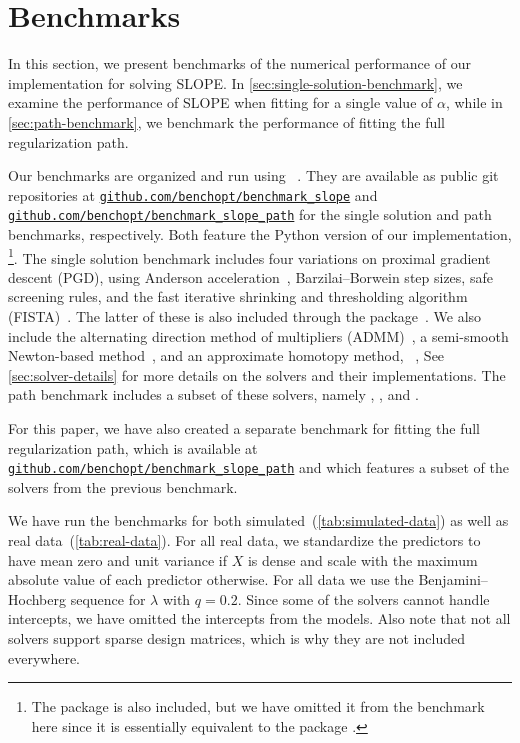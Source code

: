 \documentclass[article]{jss}
\newcommand{\myurl}[1]{\href{https://#1}{\nolinkurl{#1}}}
\begin{document}
\section{Benchmarks}

In this section, we present benchmarks of the numerical performance of our
implementation for solving SLOPE. In \autoref{sec:single-solution-benchmark}, we examine the performance of SLOPE
when fitting for a single value of \(\alpha\), while in
\autoref{sec:path-benchmark}, we benchmark the performance of fitting
the full regularization path.

Our benchmarks are organized and run using ~\citep{moreau2022a}.
They are available as public git repositories at
\myurl{github.com/benchopt/benchmark\_slope} and
\myurl{github.com/benchopt/benchmark\_slope\_path} for the single solution and
path benchmarks, respectively. Both feature the Python version of our
implementation, \footnote{The  package  is
  also included, but we have omitted it from the benchmark here since it is
  essentially equivalent to the  package .}. The
single solution benchmark includes four variations on proximal gradient
descent (PGD), using Anderson acceleration~\citep{anderson1965,zhang2020},
Barzilai--Borwein step sizes, safe screening rules, and the fast iterative
shrinking and thresholding algorithm (FISTA)~\citep{beck2009}. The latter of
these is also included through the  package~\citep{bertrand2022}.
We also include the alternating direction method of multipliers
(ADMM)~\citep{boyd2010}, a semi-smooth Newton-based method~\citep{luo2019},
and an approximate homotopy method, ~\citet{dupuis2024},
See \autoref{sec:solver-details} for more details on the solvers and their
implementations. The path benchmark includes a subset of these solvers,
namely , , and .

For this paper, we have also created a separate benchmark for fitting the full
regularization path, which is available at
\myurl{github.com/benchopt/benchmark\_slope\_path} and which features a subset
of the solvers from the previous benchmark.

We have run the benchmarks for both simulated~(\autoref{tab:simulated-data}) as
well as real data~(\autoref{tab:real-data}). For all real data, we standardize the
predictors to have mean zero and unit variance if \(X\) is dense and scale with
the maximum absolute value of each predictor otherwise. For all data we use the
Benjamini--Hochberg sequence for \(\lambda\) with \(q=0.2\). Since some of the
solvers cannot handle intercepts, we have omitted the intercepts from the
models. Also note that not all solvers support sparse design matrices, which is
why they are not included everywhere.
\end{document}
